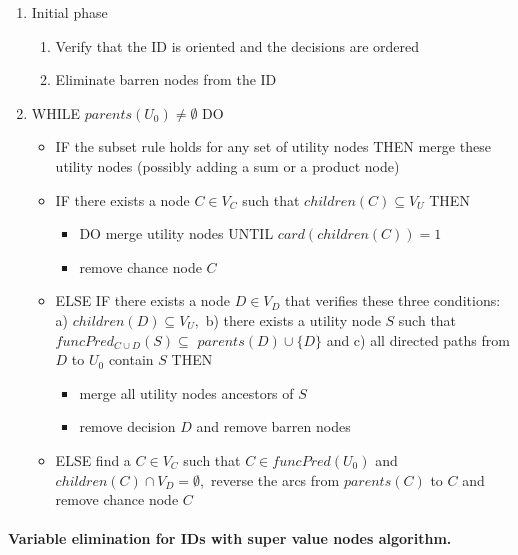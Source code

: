 \begin{enumerate}
\item Initial phase

\begin{enumerate}
\item Verify that the ID is oriented and the decisions are ordered

\item Eliminate barren nodes from the ID
\end{enumerate}

\item WHILE $parents(U_{0})\neq \emptyset $ DO

\begin{itemize}
\item IF the subset rule holds for any set of utility nodes THEN merge these
utility nodes (possibly adding a sum or a product node)

\item IF there exists a node $C\in V_{C}$ such that $children(C)\subseteq
V_{U}$ THEN

\begin{itemize}
\item DO merge utility nodes UNTIL $card(children(C))=1$

\item remove chance node $C$
\end{itemize}

\item ELSE IF there exists a node $D\in V_{D}$ that verifies these three
conditions: a) $children(D)\subseteq V_{U},$ b) there exists a utility node $%
S$ such that $funcPred_{C\cup D}(S)\subseteq $ $parents(D)\cup \{D\}$ and c)
all directed paths from $D$ to $U_{0}$ contain $S$ THEN

\begin{itemize}
\item merge all utility nodes ancestors of $S$

\item remove decision $D$ and remove barren nodes
\end{itemize}

\item ELSE find a $C\in V_{C}$ such that $C\in funcPred(U_{0})$ and $%
children(C)\cap V_{D}=\emptyset ,$ reverse the arcs from $parents(C)$ to $C$
and remove chance node $C$
\end{itemize}
\end{enumerate}

\paragraph{Variable elimination for IDs with super value nodes algorithm.}

